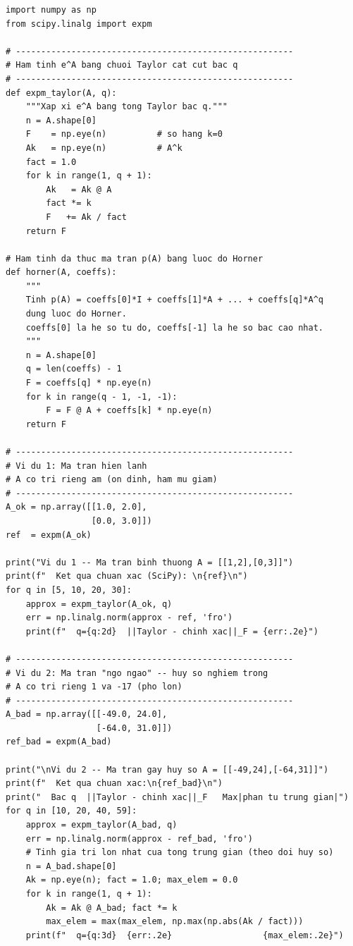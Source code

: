\documentclass[12pt,a4paper]{report}
\begin{document}
\begin{lstlisting}[style=python, caption={Phương pháp xấp xỉ: Taylor cắt cụt, Horner, và hiện tượng catastrophic cancellation}]
import numpy as np
from scipy.linalg import expm

# -------------------------------------------------------
# Ham tinh e^A bang chuoi Taylor cat cut bac q
# -------------------------------------------------------
def expm_taylor(A, q):
    """Xap xi e^A bang tong Taylor bac q."""
    n = A.shape[0]
    F    = np.eye(n)          # so hang k=0
    Ak   = np.eye(n)          # A^k
    fact = 1.0
    for k in range(1, q + 1):
        Ak   = Ak @ A
        fact *= k
        F   += Ak / fact
    return F

# Ham tinh da thuc ma tran p(A) bang luoc do Horner
def horner(A, coeffs):
    """
    Tinh p(A) = coeffs[0]*I + coeffs[1]*A + ... + coeffs[q]*A^q
    dung luoc do Horner.
    coeffs[0] la he so tu do, coeffs[-1] la he so bac cao nhat.
    """
    n = A.shape[0]
    q = len(coeffs) - 1
    F = coeffs[q] * np.eye(n)
    for k in range(q - 1, -1, -1):
        F = F @ A + coeffs[k] * np.eye(n)
    return F

# -------------------------------------------------------
# Vi du 1: Ma tran hien lanh
# A co tri rieng am (on dinh, ham mu giam)
# -------------------------------------------------------
A_ok = np.array([[1.0, 2.0],
                 [0.0, 3.0]])
ref  = expm(A_ok)

print("Vi du 1 -- Ma tran binh thuong A = [[1,2],[0,3]]")
print(f"  Ket qua chuan xac (SciPy): \n{ref}\n")
for q in [5, 10, 20, 30]:
    approx = expm_taylor(A_ok, q)
    err = np.linalg.norm(approx - ref, 'fro')
    print(f"  q={q:2d}  ||Taylor - chinh xac||_F = {err:.2e}")

# -------------------------------------------------------
# Vi du 2: Ma tran "ngo ngao" -- huy so nghiem trong
# A co tri rieng 1 va -17 (pho lon)
# -------------------------------------------------------
A_bad = np.array([[-49.0, 24.0],
                  [-64.0, 31.0]])
ref_bad = expm(A_bad)

print("\nVi du 2 -- Ma tran gay huy so A = [[-49,24],[-64,31]]")
print(f"  Ket qua chuan xac:\n{ref_bad}\n")
print("  Bac q  ||Taylor - chinh xac||_F   Max|phan tu trung gian|")
for q in [10, 20, 40, 59]:
    approx = expm_taylor(A_bad, q)
    err = np.linalg.norm(approx - ref_bad, 'fro')
    # Tinh gia tri lon nhat cua tong trung gian (theo doi huy so)
    n = A_bad.shape[0]
    Ak = np.eye(n); fact = 1.0; max_elem = 0.0
    for k in range(1, q + 1):
        Ak = Ak @ A_bad; fact *= k
        max_elem = max(max_elem, np.max(np.abs(Ak / fact)))
    print(f"  q={q:3d}  {err:.2e}                  {max_elem:.2e}")


\end{lstlisting}
\end{document}
